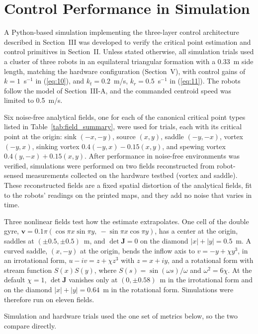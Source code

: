 \documentclass[lettersize,journal]{IEEEtran}
\begin{document}
\section{Control Performance in Simulation}

A Python-based simulation implementing the three-layer control architecture described in Section~III was developed to verify the critical point estimation and control primitives in Section~II. Unless stated otherwise, all simulation trials used a cluster of three robots in an equilateral triangular formation with a 0.33~m side length, matching the hardware configuration (Section~V), with control gains of $k = 1$~s$^{-1}$ in (\ref{eq:10}), and $k_t = 0.2$~m/s, $k_r = 0.5$~s$^{-1}$ in (\ref{eq:11}). The robots follow the model of Section~III-A, and the commanded centroid speed was limited to 0.5~m/s.

Six noise-free analytical fields, one for each of the canonical critical point types listed in Table~\ref{tab:field_summary}, were used for trials, each with its critical point at the origin: sink $(-x,-y)$, source $(x,y)$, saddle $(-y,-x)$, vortex $(-y,x)$, sinking vortex $0.4(-y,x)-0.15(x,y)$, and spewing vortex $0.4(y,-x)+0.15(x,y)$. After performance in noise-free environments was verified, simulations were performed on two fields reconstructed from robot-sensed measurements collected on the hardware testbed (vortex and saddle). These reconstructed fields are a fixed spatial distortion of the analytical fields, fit to the robots' readings on the printed maps, and they add no noise that varies in time.

Three nonlinear fields test how the estimate extrapolates. One cell of the double gyre, $\mathbf{v} = 0.1\pi(\cos\pi x \sin\pi y,\allowbreak\ -\sin\pi x \cos\pi y)$, has a center at the origin, saddles at $(\pm 0.5, \pm 0.5)$~m, and $\det\mathbf{J} = 0$ on the diamond $|x| + |y| = 0.5$~m. A curved saddle, $(x, -y)$ at the origin, bends the inflow axis to $v = -y + \chi y^3$, in an irrotational form, $u - iv = z + \chi z^3$ with $z = x + iy$, and a rotational form with stream function $S(x)S(y)$, where $S(s) = \sin(\omega s)/\omega$ and $\omega^2 = 6\chi$. At the default $\chi = 1$, $\det\mathbf{J}$ vanishes only at $(0, \pm 0.58)$~m in the irrotational form and on the diamond $|x| + |y| = 0.64$~m in the rotational form. Simulations were therefore run on eleven fields.

Simulation and hardware trials used the one set of metrics below, so the two compare directly.
\end{document}
